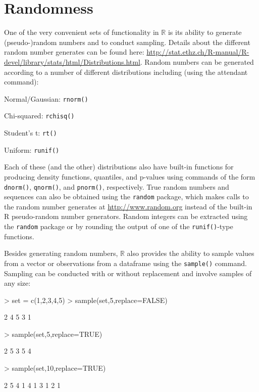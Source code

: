 \documentclass[12pt]{article}
\begin{document}
\section{Randomness}\label{sec:random}

One of the very convenient sets of functionality in $\mathbb{R}$ is its ability to generate (pseudo-)random numbers and to conduct sampling. Details about the different random number generates can be found here: \url{http://stat.ethz.ch/R-manual/R-devel/library/stats/html/Distributions.html}. Random numbers can be generated according to a number of different distributions including (using the attendant command):
\begin{itemize*}
\item Normal/Gaussian: \verb|rnorm()|
\item Chi-squared: \verb|rchisq()|
\item Student's t: \verb|rt()|
\item Uniform: \verb|runif()|
\end{itemize*}

Each of these (and the other) distributions also have built-in functions for producing density functions, quantiles, and p-values using commands of the form \verb|dnorm()|, \verb|qnorm()|, and \verb|pnorm()|, respectively. True random numbers and sequences can also be obtained using the \verb|random| package, which makes calls to the random number generates at \url{http://www.random.org} instead of the built-in R pseudo-random number generators. Random integers can be extracted using the \verb|random| package or by rounding the output of one of the \verb|runif()|-type functions.

Besides generating random numbers, $\mathbb{R}$ also provides the ability to sample values from a vector or observations from a dataframe using the \verb|sample()| command. Sampling can be conducted with or without replacement and involve samples of any size:
\begin{Schunk}
\begin{Sinput}
> set = c(1,2,3,4,5)
> sample(set,5,replace=FALSE)
\end{Sinput}
\begin{Soutput}
[1] 2 4 5 3 1
\end{Soutput}
\begin{Sinput}
> sample(set,5,replace=TRUE)
\end{Sinput}
\begin{Soutput}
[1] 2 5 3 5 4
\end{Soutput}
\begin{Sinput}
> sample(set,10,replace=TRUE)
\end{Sinput}
\begin{Soutput}
 [1] 2 5 4 1 4 1 3 1 2 1
\end{Soutput}
\end{Schunk}
\end{document}
